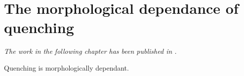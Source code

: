 \chapter{The morphological dependance of quenching}

\emph{The work in the following chapter has been published in \citet{smethurst15}.}


Quenching is morphologically dependant. 